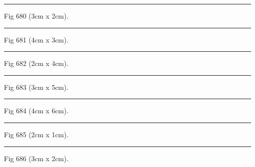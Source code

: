 \documentclass[a4paper,11pt]{article}
\begin{document}
\begin{swarmwrap}%
  \begin{minipage}[t]{3cm}
    \centering
    \rule{\linewidth}{2cm}
    {\footnotesize Fig 680 (3cm x 2cm).}
  \end{minipage}%
\end{swarmwrap}%
\swarmwrapnext
\lipsum[80]%

\begin{swarmwrap}%
  \begin{minipage}[t]{4cm}
    \centering
    \rule{\linewidth}{3cm}
    {\footnotesize Fig 681 (4cm x 3cm).}
  \end{minipage}%
\end{swarmwrap}%
\swarmwrapnext
\lipsum[81]%

\begin{swarmwrap}%
  \begin{minipage}[t]{2cm}
    \centering
    \rule{\linewidth}{4cm}
    {\footnotesize Fig 682 (2cm x 4cm).}
  \end{minipage}%
\end{swarmwrap}%
\swarmwrapnext
\lipsum[82]%

\begin{swarmwrap}%
  \begin{minipage}[t]{3cm}
    \centering
    \rule{\linewidth}{5cm}
    {\footnotesize Fig 683 (3cm x 5cm).}
  \end{minipage}%
\end{swarmwrap}%
\swarmwrapnext
\lipsum[83]%

\begin{swarmwrap}%
  \begin{minipage}[t]{4cm}
    \centering
    \rule{\linewidth}{6cm}
    {\footnotesize Fig 684 (4cm x 6cm).}
  \end{minipage}%
\end{swarmwrap}%
\swarmwrapnext
\lipsum[84]%

\begin{swarmwrap}%
  \begin{minipage}[t]{2cm}
    \centering
    \rule{\linewidth}{1cm}
    {\footnotesize Fig 685 (2cm x 1cm).}
  \end{minipage}%
\end{swarmwrap}%
\swarmwrapnext
\lipsum[85]%

\begin{swarmwrap}%
  \begin{minipage}[t]{3cm}
    \centering
    \rule{\linewidth}{2cm}
    {\footnotesize Fig 686 (3cm x 2cm).}
  \end{minipage}%
\end{swarmwrap}%
\swarmwrapnext
\lipsum[86]%
\end{document}
